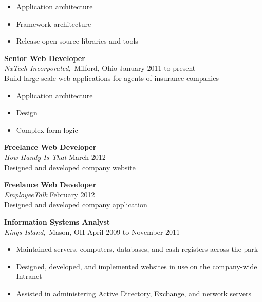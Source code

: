 \documentclass[11pt, line]{res}
\begin{document}
\begin{resume}
				\begin{itemize}
					\item Application architecture
					\item Framework architecture
					\item Release open-source libraries and tools
				\end{itemize}

			\vspace{-4pt}
				\textbf{Senior Web Developer} \\
				\textit{NxTech Incorporated},\, Milford, Ohio
					\hfill January 2011 to present \\
				Build large-scale web applications for agents of insurance companies

				\begin{itemize}
					\item Application architecture
					\item Design
					\item Complex form logic
				\end{itemize}

			\vspace{-4pt}
				\textbf{Freelance Web Developer} \\
				\textit{How Handy Is That}
					\hfill March 2012 \\
				Designed and developed company website

			\vspace{-4pt}
				\textbf{Freelance Web Developer} \\
				\textit{EmployeeTalk}
					\hfill February 2012 \\
				Designed and developed company application

			\vspace{-4pt}
				\textbf{Information Systems Analyst} \\
				\textit{Kings Island},\, Mason, OH
					\hfill April 2009 to November 2011

				\begin{itemize}
					\item Maintained servers, computers, databases, and cash registers across the park
					\item Designed, developed, and implemented websites in use on the company-wide Intranet
					\item Assisted in administering Active Directory, Exchange, and network servers
				\end{itemize}
	\end{resume}
\end{document}
